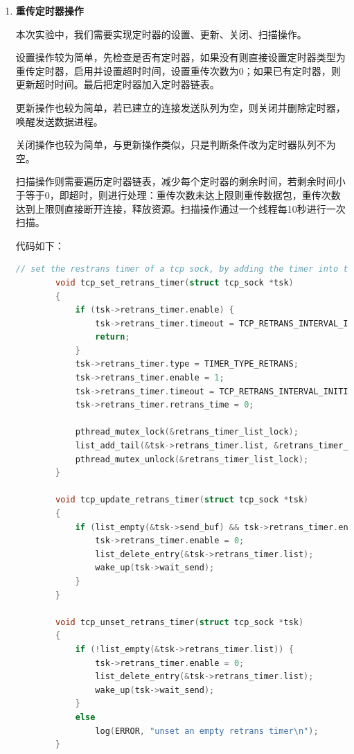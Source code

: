 \documentclass[UTF8]{report}
\newcommand{\tbf}[1]{\textbf{#1}}
\begin{document}
\begin{enumerate}
    \item \tbf{重传定时器操作}
    
    本次实验中，我们需要实现定时器的设置、更新、关闭、扫描操作。
    
    设置操作较为简单，先检查是否有定时器，如果没有则直接设置定时器类型为重传定时器，启用并设置超时时间，设置重传次数为0；如果已有定时器，则更新超时时间。最后把定时器加入定时器链表。

    更新操作也较为简单，若已建立的连接发送队列为空，则关闭并删除定时器，唤醒发送数据进程。

    关闭操作也较为简单，与更新操作类似，只是判断条件改为定时器队列不为空。

    扫描操作则需要遍历定时器链表，减少每个定时器的剩余时间，若剩余时间小于等于0，即超时，则进行处理：重传次数未达上限则重传数据包，重传次数达到上限则直接断开连接，释放资源。扫描操作通过一个线程每10秒进行一次扫描。

    代码如下：

    \begin{lstlisting}[language=C]
        // set the restrans timer of a tcp sock, by adding the timer into timer_list
        void tcp_set_retrans_timer(struct tcp_sock *tsk)
        {
            if (tsk->retrans_timer.enable) {
                tsk->retrans_timer.timeout = TCP_RETRANS_INTERVAL_INITIAL;
                return;
            }
            tsk->retrans_timer.type = TIMER_TYPE_RETRANS;
            tsk->retrans_timer.enable = 1;
            tsk->retrans_timer.timeout = TCP_RETRANS_INTERVAL_INITIAL;
            tsk->retrans_timer.retrans_time = 0;
        
            pthread_mutex_lock(&retrans_timer_list_lock);
            list_add_tail(&tsk->retrans_timer.list, &retrans_timer_list);
            pthread_mutex_unlock(&retrans_timer_list_lock);
        }
        
        void tcp_update_retrans_timer(struct tcp_sock *tsk)
        {
            if (list_empty(&tsk->send_buf) && tsk->retrans_timer.enable) {
                tsk->retrans_timer.enable = 0;
                list_delete_entry(&tsk->retrans_timer.list);
                wake_up(tsk->wait_send);
            }
        }
        
        void tcp_unset_retrans_timer(struct tcp_sock *tsk)
        {
            if (!list_empty(&tsk->retrans_timer.list)) {
                tsk->retrans_timer.enable = 0;
                list_delete_entry(&tsk->retrans_timer.list);
                wake_up(tsk->wait_send);
            }
            else
                log(ERROR, "unset an empty retrans timer\n");
        }
        

\end{lstlisting}
\end{enumerate}
\end{document}
